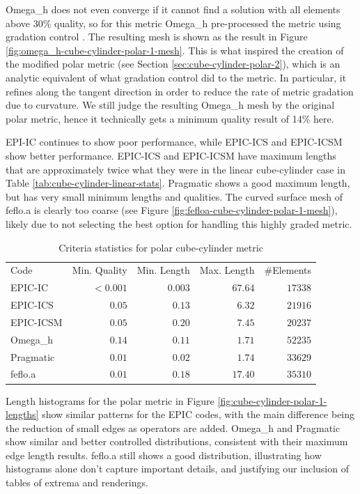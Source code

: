 \documentclass[3p,times,procedia,number]{elsarticle}
\begin{document}
Omega\_h does not even converge if it cannot find a solution with
all elements above 30\% quality, so for this metric Omega\_h
pre-processed the metric using gradation control \cite{alauzet-fead-2010-size-gradation-aniso}.
The resulting mesh is shown as the result in Figure \ref{fig:omega_h-cube-cylinder-polar-1-mesh}.
This is what inspired the creation of the modified polar metric
(see Section \ref{sec:cube-cylinder-polar-2}),
which is an analytic equivalent of what gradation control did
to the metric.
In particular, it refines along the tangent direction
in order to reduce the rate of metric gradation due to curvature.
We still judge the resulting Omega\_h mesh by the original polar
metric, hence it technically gets a minimum quality result of 14\% here.

EPI-IC continues to show poor performance, while EPIC-ICS
and EPIC-ICSM show better performance.
EPIC-ICS and EPIC-ICSM have maximum lengths that are approximately
twice what they were in the linear cube-cylinder case in
Table \ref{tab:cube-cylinder-linear-stats}.
Pragmatic shows a good maximum length,
but has very small minimum lengths and qualities.
The curved surface mesh of feflo.a is clearly too coarse
(see Figure \ref{fig:fefloa-cube-cylinder-polar-1-mesh}),
likely due to not selecting the best option for handling
this highly graded metric.

\begin{table}
\caption{Criteria statistics for polar cube-cylinder metric}
\label{tab:polar-1-stats}
\begin{tabular}{lrrrr}
Code & Min. Quality & Min. Length & Max. Length & \#Elements\\
EPIC-IC    &$<0.001$&      $0.003$&      $67.64$&    $17338$\\
EPIC-ICS   &$  0.05$&      $ 0.13$&      $ 6.32$&    $21916$\\
EPIC-ICSM  &$  0.05$&      $ 0.20$&      $ 7.45$&    $20237$\\
Omega\_h   &$  0.14$&      $ 0.11$&      $ 1.71$&    $52235$\\
Pragmatic  &$  0.01$&      $ 0.02$&      $ 1.74$&    $33629$\\
feflo.a    &$  0.01$&      $ 0.18$&      $17.40$&    $35310$\\
\end{tabular}
\end{table}

Length histograms for the polar metric in Figure \ref{fig:cube-cylinder-polar-1-lengths}
show similar patterns for the EPIC codes, with the main difference being the
reduction of small edges as operators are added.
Omega\_h and Pragmatic show similar and better controlled distributions, consistent
with their maximum edge length results.
feflo.a still shows a good distribution, illustrating how histograms alone
don't capture important details, and justifying our inclusion of tables of extrema
and renderings.
\end{document}
